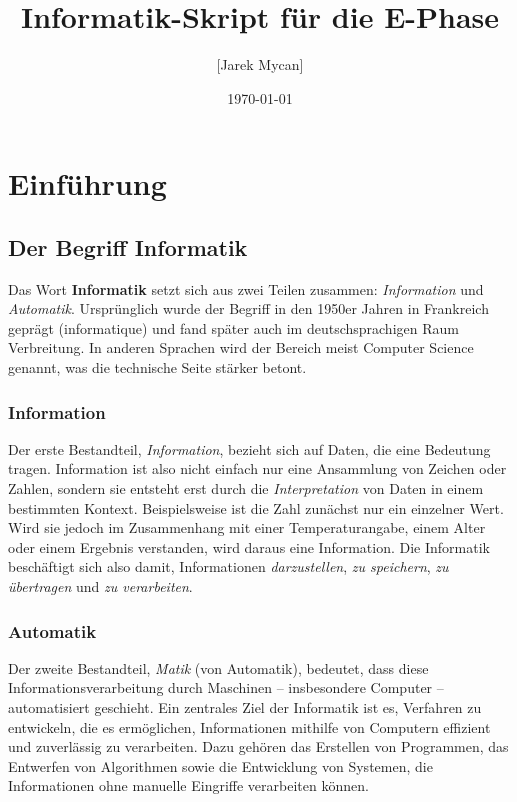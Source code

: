 \documentclass[12pt,a4paper]{book}
\begin{document}
\frontmatter
\title{Informatik-Skript für die E-Phase}
\author{[Jarek Mycan]}
\date{\today}
\maketitle

\tableofcontents

\mainmatter

\chapter{Einführung}
\section{Der Begriff Informatik}

Das Wort \textbf{Informatik} setzt sich aus zwei Teilen zusammen: \emph{Information} und \emph{Automatik}. 
Ursprünglich wurde der Begriff in den 1950er Jahren in Frankreich geprägt 
(\glqq informatique\grqq{}) und fand später auch im deutschsprachigen Raum Verbreitung. 
In anderen Sprachen wird der Bereich meist \glqq Computer Science\grqq{} genannt, 
was die technische Seite stärker betont. 

\subsection{Information}
Der erste Bestandteil, \emph{Information}, bezieht sich auf Daten, die eine Bedeutung tragen. 
Information ist also nicht einfach nur eine Ansammlung von Zeichen oder Zahlen, 
sondern sie entsteht erst durch die \emph{Interpretation} von Daten in einem bestimmten Kontext.  
Beispielsweise ist die Zahl \grqq{} zunächst nur ein einzelner Wert.
Wird sie jedoch im Zusammenhang mit einer Temperaturangabe, einem Alter oder einem Ergebnis verstanden, wird daraus eine Information.  
Die Informatik beschäftigt sich also damit, Informationen \emph{darzustellen}, 
\emph{zu speichern}, \emph{zu übertragen} und \emph{zu verarbeiten}.

\subsection{Automatik}
Der zweite Bestandteil, \emph{Matik} (von Automatik), bedeutet, dass diese Informationsverarbeitung 
durch Maschinen – insbesondere Computer – automatisiert geschieht.  
Ein zentrales Ziel der Informatik ist es, Verfahren zu entwickeln, die es ermöglichen, 
Informationen mithilfe von Computern effizient und zuverlässig zu verarbeiten. 
Dazu gehören das Erstellen von Programmen, das Entwerfen von Algorithmen 
sowie die Entwicklung von Systemen, die Informationen ohne manuelle Eingriffe verarbeiten können.
\end{document}
